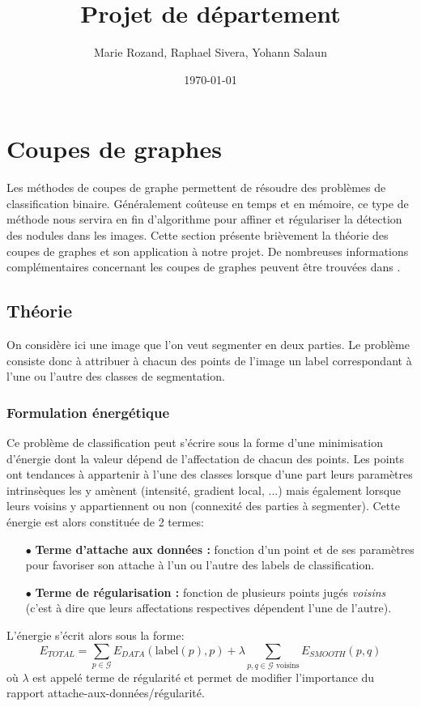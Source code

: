 \documentclass{article}
\title{Projet de département}
\author{Marie Rozand, Raphael Sivera, Yohann Salaun}
\date{\today}
\newcommand{\lab}{\text{label}}
\begin{document}
\maketitle

\section{Coupes de graphes}

Les méthodes de coupes de graphe permettent de résoudre des problèmes de classification binaire. Généralement coûteuse en temps et en mémoire, ce type de méthode nous servira en fin d'algorithme pour affiner et régulariser la détection des nodules dans les images. Cette section présente brièvement la théorie des coupes de graphes et son application à notre projet. De nombreuses informations complémentaires concernant les coupes de graphes peuvent être trouvées dans \cite{bib:GC04, bib:GC05}.		

\subsection{Théorie}

On considère ici une image que l'on veut segmenter en deux parties. Le problème consiste donc à attribuer à chacun des points de l'image un label correspondant à l'une ou l'autre des classes de segmentation.

\subsubsection{Formulation énergétique}

Ce problème de classification peut s'écrire sous la forme d'une minimisation d'énergie dont la valeur dépend de l'affectation de chacun des points. Les points ont tendances à appartenir à l'une des classes lorsque d'une part leurs paramètres intrinsèques les y amènent (intensité, gradient local, ...) mais également lorsque leurs voisins y appartiennent ou non (connexité des parties à segmenter). Cette énergie est alors constituée de 2 termes:
\begin{itemize}
	\item[$\bullet$]\textbf{Terme d'attache aux données :} fonction d'un point et de ses paramètres pour favoriser son attache à l'un ou l'autre des labels de classification.
	\item[$\bullet$]\textbf{Terme de régularisation :} fonction de plusieurs points jugés \textit{voisins} (c'est à dire que leurs affectations respectives dépendent l'une de l'autre).
\end{itemize}
L'énergie s'écrit alors sous la forme:
\[
	E_{TOTAL} = \sum_{p \in \mathcal{G}} E_{DATA}(\lab(p), p) + \lambda \sum _{p,q \in \mathcal{G} \text{ voisins}} E_{SMOOTH}(p,q)
\]
où $\lambda$ est appelé terme de régularité et permet de modifier l'importance du rapport attache-aux-données/régularité.\\
\end{document}
